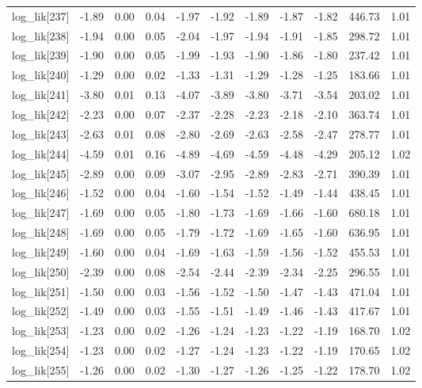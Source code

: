 \begin{table}[ht]
\begin{tabular}{rrrrrrrrrrr}
  log\_lik[237] & -1.89 & 0.00 & 0.04 & -1.97 & -1.92 & -1.89 & -1.87 & -1.82 & 446.73 & 1.01 \\ 
  log\_lik[238] & -1.94 & 0.00 & 0.05 & -2.04 & -1.97 & -1.94 & -1.91 & -1.85 & 298.72 & 1.01 \\ 
  log\_lik[239] & -1.90 & 0.00 & 0.05 & -1.99 & -1.93 & -1.90 & -1.86 & -1.80 & 237.42 & 1.01 \\ 
  log\_lik[240] & -1.29 & 0.00 & 0.02 & -1.33 & -1.31 & -1.29 & -1.28 & -1.25 & 183.66 & 1.01 \\ 
  log\_lik[241] & -3.80 & 0.01 & 0.13 & -4.07 & -3.89 & -3.80 & -3.71 & -3.54 & 203.02 & 1.01 \\ 
  log\_lik[242] & -2.23 & 0.00 & 0.07 & -2.37 & -2.28 & -2.23 & -2.18 & -2.10 & 363.74 & 1.01 \\ 
  log\_lik[243] & -2.63 & 0.01 & 0.08 & -2.80 & -2.69 & -2.63 & -2.58 & -2.47 & 278.77 & 1.01 \\ 
  log\_lik[244] & -4.59 & 0.01 & 0.16 & -4.89 & -4.69 & -4.59 & -4.48 & -4.29 & 205.12 & 1.02 \\ 
  log\_lik[245] & -2.89 & 0.00 & 0.09 & -3.07 & -2.95 & -2.89 & -2.83 & -2.71 & 390.39 & 1.01 \\ 
  log\_lik[246] & -1.52 & 0.00 & 0.04 & -1.60 & -1.54 & -1.52 & -1.49 & -1.44 & 438.45 & 1.01 \\ 
  log\_lik[247] & -1.69 & 0.00 & 0.05 & -1.80 & -1.73 & -1.69 & -1.66 & -1.60 & 680.18 & 1.01 \\ 
  log\_lik[248] & -1.69 & 0.00 & 0.05 & -1.79 & -1.72 & -1.69 & -1.65 & -1.60 & 636.95 & 1.01 \\ 
  log\_lik[249] & -1.60 & 0.00 & 0.04 & -1.69 & -1.63 & -1.59 & -1.56 & -1.52 & 455.53 & 1.01 \\ 
  log\_lik[250] & -2.39 & 0.00 & 0.08 & -2.54 & -2.44 & -2.39 & -2.34 & -2.25 & 296.55 & 1.01 \\ 
  log\_lik[251] & -1.50 & 0.00 & 0.03 & -1.56 & -1.52 & -1.50 & -1.47 & -1.43 & 471.04 & 1.01 \\ 
  log\_lik[252] & -1.49 & 0.00 & 0.03 & -1.55 & -1.51 & -1.49 & -1.46 & -1.43 & 417.67 & 1.01 \\ 
  log\_lik[253] & -1.23 & 0.00 & 0.02 & -1.26 & -1.24 & -1.23 & -1.22 & -1.19 & 168.70 & 1.02 \\ 
  log\_lik[254] & -1.23 & 0.00 & 0.02 & -1.27 & -1.24 & -1.23 & -1.22 & -1.19 & 170.65 & 1.02 \\ 
  log\_lik[255] & -1.26 & 0.00 & 0.02 & -1.30 & -1.27 & -1.26 & -1.25 & -1.22 & 178.70 & 1.02 \\ 

\end{tabular}
\end{table}

